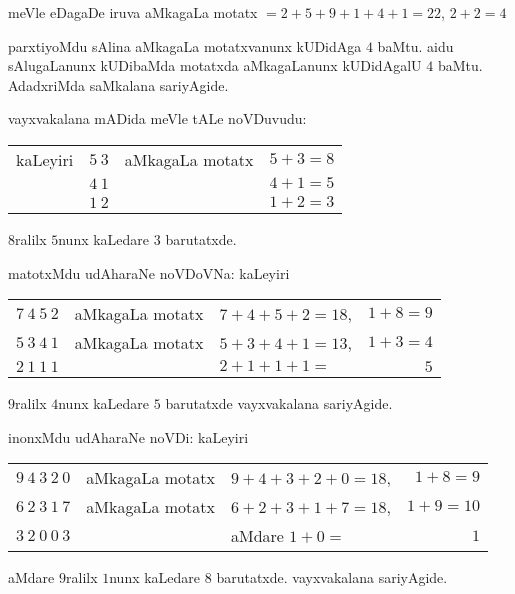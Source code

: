 \smallskip

\smallskip

meVle eDagaDe iruva aMkagaLa motatx $=2+5+9+1+4+1=22$, $2+2=4$

parxtiyoMdu sAlina aMkagaLa motatxvanunx kUDidAga $4$ baMtu. aidu sAlugaLanunx kUDibaMda motatxda aMkagaLanunx kUDidAgalU $4$ baMtu. AdadxriMda saMkalana sariyAgide.

vayxvakalana mADida meVle tALe noVDuvudu:

\smallskip

\begin{tabular}{lcll}
kaLeyiri & $5~3$ & aMkagaLa motatx & $5+3=8$\\
& $4~1$ & & $4+1=5$\\\cline{2-2}\cline{4-4}
& $1~2$ & & $1+2 =3$
\end{tabular}

\smallskip

$8$ralilx $5$nunx kaLedare $3$ barutatxde. 

matotxMdu udAharaNe noVDoVNa: kaLeyiri

\smallskip

\begin{tabular}{lclr}
$7~4~5~2$ & aMkagaLa motatx & $7+4+5+2=18$, & $1+8=9$ \\
$5~3~4~1$ & aMkagaLa motatx & $5+3+4+1=13$, & $1+3=4$\\\cline{1-1}\cline{3-3}\cline{4-4}
$2~1~1~1$ & & $2+1+1+1 =$  & $5$
\end{tabular}

\smallskip

$9$ralilx $4$nunx kaLedare $5$ barutatxde vayxvakalana sariyAgide.

inonxMdu udAharaNe noVDi: kaLeyiri

\smallskip

\begin{tabular}{lclr}
$9~4~3~2~0$ & aMkagaLa motatx & $9+4+3+2+0=18$, & $1+8=9$\\
$6~2~3~1~7$ & aMkagaLa motatx & $6+2+3+1+7=18$, & $1+9=10$\\\cline{1-1}\cline{3-4}
$3~2~0~0~3$ & & aMdare $1+0 =$ & $1$
\end{tabular}

\smallskip

aMdare $9$ralilx $1$nunx kaLedare $8$ barutatxde. vayxvakalana sariyAgide.
